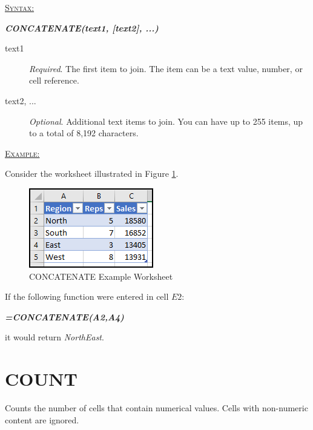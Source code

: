 \begin{addmargin}[1cm]{0cm}

	\medskip
	\underline{\textsc{Syntax:}}
	\medskip

	{\color{Syntax}
		\noindent\textbf{\textit{CONCATENATE(text1, [text2], ...)}}
	}
	
	\begin{description}
		\item[text1] \textit{Required}. The first item to join. The item can be a text value, number, or cell reference.
		\item[text2, ...] \textit{Optional}. Additional text items to join. You can have up to 255 items, up to a total of 8,192 characters.
	\end{description}

	\medskip
	\noindent\underline{\textsc{Example:}}
	\medskip
	
	\noindent Consider the worksheet illustrated in Figure \ref{apa:con}.

	\begin{figure}[H]
		\centering
		\includegraphics[width=\maxwidth{.45\linewidth}]{gfx/apa_fig01}
		\caption{CONCATENATE Example Worksheet}
		\label{apa:con}
	\end{figure}
	
	\noindent If the following function were entered in cell $ E2 $:
	
	{\color{Syntax}
		\textit{\textbf{=CONCATENATE(A2,A4)}}
	}
	
	\noindent it would return \textit{NorthEast}.
	
\end{addmargin}

\section{COUNT}

Counts the number of cells that contain numerical values. Cells with non-numeric content are ignored.

